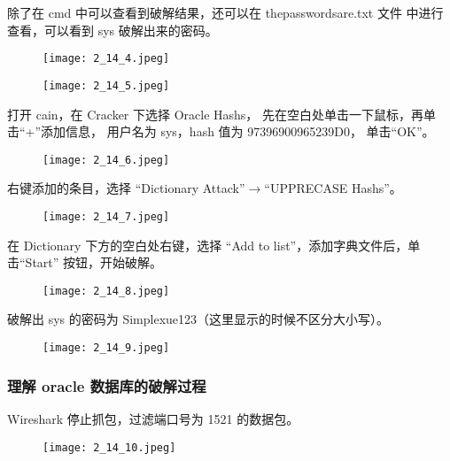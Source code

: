 除了在 cmd 中可以查看到破解结果，还可以在 thepasswordsare.txt 文件
中进行查看，可以看到 sys 破解出来的密码。
\begin{figure}[H]
  \begin{center}
    \texttt{[image: 2\_14\_4.jpeg]}
  \end{center}
\end{figure}
\begin{figure}[H]
  \begin{center}
    \texttt{[image: 2\_14\_5.jpeg]}
  \end{center}
\end{figure}

打开 cain，在 Cracker 下选择 Oracle Hashs，
先在空白处单击一下鼠标，再单击``+''添加信息，
用户名为 sys，hash 值为 97396900965239D0，
单击``OK''。
\begin{figure}[H]
  \begin{center}
    \texttt{[image: 2\_14\_6.jpeg]}
  \end{center}
\end{figure}

右键添加的条目，选择
``Dictionary Attack''$ \rightarrow $``UPPRECASE Hashs''。
\begin{figure}[H]
  \begin{center}
    \texttt{[image: 2\_14\_7.jpeg]}
  \end{center}
\end{figure}

在 Dictionary 下方的空白处右键，选择
``Add to list''，添加字典文件后，单击``Start'' 按钮，开始破解。
\begin{figure}[H]
  \begin{center}
    \texttt{[image: 2\_14\_8.jpeg]}
  \end{center}
\end{figure}

破解出 sys 的密码为 Simplexue123（这里显示的时候不区分大小写）。
\begin{figure}[H]
  \begin{center}
    \texttt{[image: 2\_14\_9.jpeg]}
  \end{center}
\end{figure}
%
\subsubsection{理解 oracle 数据库的破解过程}
Wireshark 停止抓包，过滤端口号为 1521 的数据包。
\begin{figure}[H]
  \begin{center}
    \texttt{[image: 2\_14\_10.jpeg]}
  \end{center}
\end{figure}

